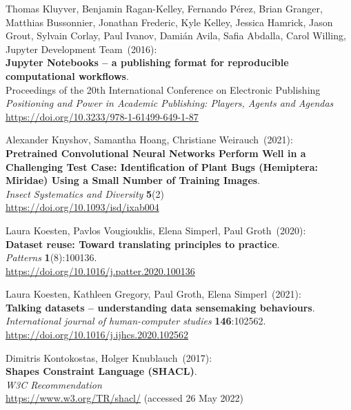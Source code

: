 \begin{thebibliography}{9}
Thomas Kluyver, Benjamin Ragan-Kelley, Fernando Pérez, Brian Granger, Matthias Bussonnier, Jonathan Frederic, Kyle Kelley, Jessica Hamrick, Jason Grout, Sylvain Corlay, Paul Ivanov, Damián Avila, Safia Abdalla, Carol Willing, Jupyter Development Team~(2016): \\
\textbf{Jupyter Notebooks – a publishing format for reproducible computational workflows}.\\
Proceedings of the 20th International Conference on Electronic Publishing\\
\emph{Positioning and Power in Academic Publishing: Players, Agents and Agendas}\\ 
\url{https://doi.org/10.3233/978-1-61499-649-1-87}

Alexander Knyshov, Samantha Hoang, Christiane Weirauch~(2021): \\
\textbf{Pretrained Convolutional Neural Networks Perform Well in a Challenging Test Case: Identification of Plant Bugs (Hemiptera: Miridae) Using a Small Number of Training Images}. \\
\emph{Insect Systematics and Diversity} \textbf{5}(2)\\
\url{https://doi.org/10.1093/isd/ixab004}

Laura Koesten, Pavlos Vougiouklis, Elena Simperl, Paul Groth~(2020): \\
\textbf{Dataset reuse: Toward translating principles to practice}.\\
\emph{Patterns} \textbf{1}(8):100136.\\
\url{https://doi.org/10.1016/j.patter.2020.100136}

Laura Koesten, Kathleen Gregory, Paul Groth, Elena Simperl~(2021): \\
\textbf{Talking datasets -- understanding data sensemaking behaviours}.\\
\emph{International journal of human-computer studies}
\textbf{146}:102562.\\
\url{https://doi.org/10.1016/j.ijhcs.2020.102562}

Dimitris Kontokostas, Holger Knublauch~(2017): \\
\textbf{Shapes {Constraint Language} ({SHACL})}.\\
\emph{W3C Recommendation}\\
\url{https://www.w3.org/TR/shacl/} (accessed 26 May 2022)


\end{thebibliography}

